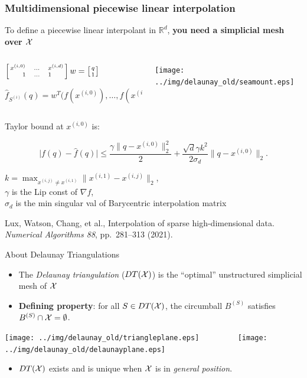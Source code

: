 \documentclass[aspectratio=169]{beamer}
\newcommand{\cmark}{\ding{51}}
\newcommand{\xmark}{\ding{55}}
\begin{document}
\begin{frame}
\frametitle{Multidimensional piecewise linear interpolation}

To define a piecewise linear interpolant in $\mathbb{R}^d$,
{\bf you need a simplicial mesh over ${\cal X}$}

\begin{columns}
\begin{column}{.62\textwidth}
$\left[x^{(i,0)} \quad \ldots \quad x^{(i,d)} \atop 1 \quad \ldots \quad 1\right]w = \left[q \atop 1\right]$

$$
{\hat f}_{S^{(i)}}(q) = w^T \big(f(x^{(i,0)}), \ldots, f(x^{(i,d)})\big).
$$

\end{column}
\begin{column}{.3\textwidth}
\hbox{\texttt{[image: ../img/delaunay\_old/seamount.eps]}}
\end{column}
\end{columns}

\pause
Taylor bound at $x^{(i,0)}$ is:

$$
\big|f(q) - \hat f(q)\big| \leq \frac{\gamma \|q - x^{(i,0)}\|_{2}^{2}}{2} + \frac{\sqrt{d}  \gamma k^{2}}{2 \sigma_{d}} \|q - x^{(i,0)}\|_{2}.
$$

{\small
$k = \max_{x^{(i,j)} \neq x^{(i,1)}} \|x^{(i,1)} - x^{(i,j)}\|_2$,\\
$\gamma$ is the Lip const of $\nabla f$,\\
$\sigma_d$ is the min singular val of Barycentric interpolation matrix}

\vfill

{\tiny Lux, Watson, Chang, et al.,
Interpolation of sparse high-dimensional data.
{\sl Numerical Algorithms 88}, pp.~281–313 (2021).}

\end{frame}

\begin{frame}{About Delaunay Triangulations}
\begin{itemize}
\item The {\it Delaunay triangulation} ($DT({\cal X})$)
is the ``optimal'' unstructured simplicial mesh of ${\cal X}$
\item {\bf Defining property}:
for all $S \in DT({\cal X})$, the circumball $B^{(S)}$
satisfies
$B^{(S)} \cap {\cal X} = \emptyset$.
\end{itemize}
\begin{center}
\texttt{[image: ../img/delaunay\_old/triangleplane.eps]}
\hskip 4pt{\color{red} \xmark}
$\qquad\qquad$
\texttt{[image: ../img/delaunay\_old/delaunayplane.eps]}
\hskip 4pt{\color{green} \cmark}
\end{center}
\begin{itemize}
\item $DT({\cal X})$ exists and is unique when ${\cal X}$ is in {\it general position}.
\end{itemize}
\end{frame}
\end{document}
